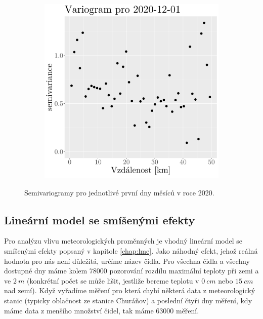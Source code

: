 \begin{figure}
\begin{subfigure}{0.30\textwidth}
		\caption{}
		\label{fig:variogram11}
	\end{subfigure}
\hfill
	\begin{subfigure}{0.30\textwidth}
		\includegraphics[width=\textwidth]{img/ch2/variograms/variogram_max15cm12.png}
		\caption{}
		\label{fig:variogram12}
	\end{subfigure}
	\caption{Semivariogramy pro jednotlivé první dny měsíců v roce 2020.}
	\label{fig:variograms}
\end{figure}

\subsection{Lineární model se smíšenými efekty}
Pro analýzu vlivu meteorologických proměnných je vhodný lineární model se smíšenými efekty popsaný v kapitole \ref{chap:lme}. Jako náhodný efekt, jehož reálná hodnota pro nás není důležitá, určíme název čidla. Pro všechna čidla a všechny dostupné dny máme kolem 78000 pozorování rozdílu maximální teploty při zemi a ve $\SI{2}{m}$ (konkrétní počet se může lišit, jestliže bereme teplotu v $\SI{0}{cm}$ nebo $\SI{15}{cm}$ nad zemí). Když vyřadíme měření pro která chybí některá data z meteorologický stanic (typicky oblačnost ze stanice Churáňov) a poslední čtyři dny měření, kdy máme data z menšího množství čidel, tak máme 63000 měření.

